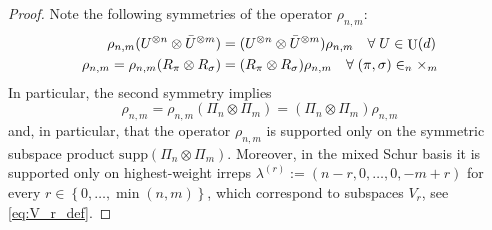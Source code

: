 \documentclass[aps,twocolumn,pra,superscriptaddress,nofootinbib]{revtex4-2}
\newcommand{\set}[1]{\left\{#1\right\}}
\newcommand{\xp}[1]{^{\otimes #1}}
\let\S\relax
\DeclareMathOperator{\S}{S} %
\DeclareMathOperator{\U}{U}
\begin{document}
\begin{proof}
    Note the following symmetries of the operator $\rho_{n,m}$:
    \begin{align}
        \rho_{n,m} (U\xp{n} \otimes \bar{U}\xp{m}) &= (U\xp{n} \otimes \bar{U}\xp{m}) \rho_{n,m} \quad \forall \; U \in \U(d) \label{eq_sym1}\\
        \rho_{n,m} = \rho_{n,m} (R_\pi \otimes R_\sigma) &= (R_\pi \otimes R_\sigma) \rho_{n,m} \quad \forall \; (\pi,\sigma) \in \S_n \times \S_m \label{eq_sym2}
    \end{align}
    In particular, the second symmetry implies 
    \begin{equation}
        \rho_{n,m} = \rho_{n,m} (\Pi_{n} \otimes \Pi_{m}) = ( \Pi_{n} \otimes \Pi_{m}) \rho_{n,m}
        \label{eq_sym3}
    \end{equation}
    and, in particular, that the operator $\rho_{n,m}$ is supported only on the symmetric subspace product $\mathrm{supp}( \Pi_{n} \otimes \Pi_{m})$.
    Moreover, in the mixed Schur basis it is supported only on highest-weight irreps $\lambda^{(r)} := (n-r,0,\dotsc,0,-m+r)$ for every $r \in \set{0,\dotsc,\min(n,m)}$, which correspond to subspaces $V_r$, see \cref{eq:V_r_def}.


\end{proof}
\end{document}
